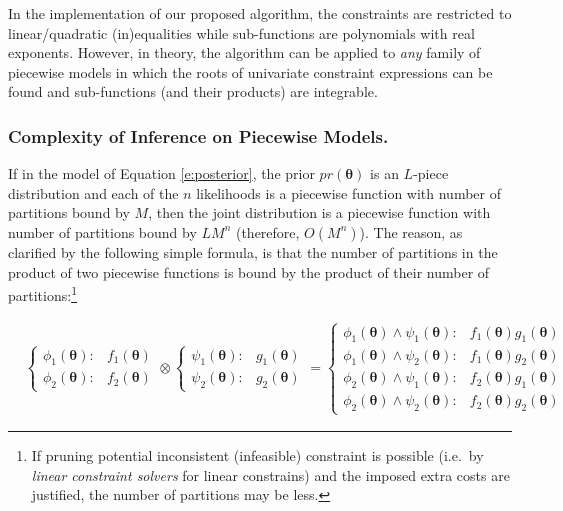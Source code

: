 \documentclass[letterpaper]{article}
\begin{document}
In the implementation of our proposed algorithm, the constraints are restricted to linear/quadratic (in)equalities while sub-functions are polynomials with real exponents. 
However, in theory, the algorithm can be applied to \emph{any} family of piecewise models in which the roots of univariate constraint expressions can be found and sub-functions (and their products) are integrable. 

\subsubsection{Complexity of Inference on Piecewise Models.}
If in the model of Equation \ref{e:posterior}, the prior $pr(\boldsymbol\theta)$ 
is an $L$-piece distribution and each of the $n$ likelihoods is a piecewise function with number of partitions  bound by $M$, 
then the joint distribution is a piecewise function with number of partitions bound by $LM^n$ (therefore, $O(M^n)$).
The reason, as clarified by the following simple formula,   
is that the number of partitions in the product of two piecewise functions is bound by the product of their number of partitions:\footnote{
If pruning potential inconsistent (infeasible) constraint is possible
(i.e.\ by \emph{linear constraint solvers} for linear constrains) and the imposed extra costs are justified,
the number of partitions may be less.
}%

{\footnotesize
\begin{align*}
&\begin{cases}
\!\phi_1(\boldsymbol{\theta}) \!: &\!\!\!\!\! f_1(\boldsymbol{\theta})\\
\!\phi_2(\boldsymbol{\theta}) \!: &\!\!\!\!\! f_2(\boldsymbol{\theta})
\end{cases}
\!\otimes\!
\begin{cases}
\!\psi_1(\boldsymbol{\theta}) \!: &\!\!\!\!\! g_1(\boldsymbol{\theta})\\
\!\psi_2(\boldsymbol{\theta}) \!: &\!\!\!\!\! g_2(\boldsymbol{\theta})
\end{cases}
\!\!=\!
\begin{cases}
\!\phi_1(\boldsymbol{\theta}) \wedge \psi_1(\boldsymbol{\theta}) \! :\!\!\!\!\! & f_1(\boldsymbol{\theta}) g_1(\boldsymbol{\theta})\\
\!\phi_1(\boldsymbol{\theta}) \wedge \psi_2(\boldsymbol{\theta}) \! :\!\!\!\!\! & f_1(\boldsymbol{\theta}) g_2(\boldsymbol{\theta})\\
\!\phi_2(\boldsymbol{\theta}) \wedge \psi_1(\boldsymbol{\theta}) \! :\!\!\!\!\! & f_2(\boldsymbol{\theta}) g_1(\boldsymbol{\theta})\\
\!\phi_2(\boldsymbol{\theta}) \wedge \psi_2(\boldsymbol{\theta}) \! :\!\!\!\!\! & f_2(\boldsymbol{\theta}) g_2(\boldsymbol{\theta})
\end{cases}
\end{align*}
}%
\end{document}
